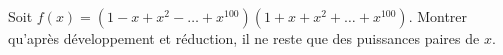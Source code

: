 Soit $f(x) = \left(1 - x + x^2 - \ldots + x^{100}\right)\left(1 + x + x^2 + \ldots + x^{100}\right)$. Montrer qu'après développement et réduction, il ne reste que des puissances paires de $x$.
